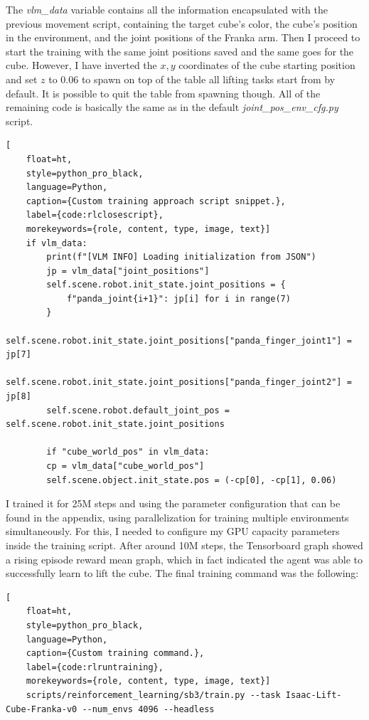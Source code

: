 The \textit{vlm\_data} variable contains all the information encapsulated with the previous movement script, containing the target cube's color, the cube's position in the environment, and the joint positions of the Franka arm. Then I proceed to start the training with the same joint positions saved and the same goes for the cube. However, I have inverted the $x, y$ coordinates of the cube starting position and set $z$ to 0.06 to spawn on top of the table all lifting tasks start from by default. It is possible to quit the table from spawning though. All of the remaining code is basically the same as in the default \textit{joint\_pos\_env\_cfg.py} script.

\begin{lstlisting}[
	float=ht,
	style=python_pro_black,
	language=Python, 
	caption={Custom training approach script snippet.},
	label={code:rlclosescript},
	morekeywords={role, content, type, image, text}]
	if vlm_data:
		print(f"[VLM INFO] Loading initialization from JSON")
		jp = vlm_data["joint_positions"]
		self.scene.robot.init_state.joint_positions = {
			f"panda_joint{i+1}": jp[i] for i in range(7)
		}
		self.scene.robot.init_state.joint_positions["panda_finger_joint1"] = jp[7]
		self.scene.robot.init_state.joint_positions["panda_finger_joint2"] = jp[8]
		self.scene.robot.default_joint_pos = self.scene.robot.init_state.joint_positions
	
		if "cube_world_pos" in vlm_data:
		cp = vlm_data["cube_world_pos"]
		self.scene.object.init_state.pos = (-cp[0], -cp[1], 0.06)
\end{lstlisting}

I trained it for 25M steps and using the parameter configuration that can be found in the appendix, using parallelization for training multiple environments simultaneously. For this, I needed to configure my GPU capacity parameters inside the training script. After around 10M steps, the Tensorboard graph showed a rising episode reward mean graph, which in fact indicated the agent was able to successfully learn to lift the cube. The final training command was the following:

\begin{lstlisting}[
	float=ht, 
	style=python_pro_black,
	language=Python, 
	caption={Custom training command.},
	label={code:rlruntraining},
	morekeywords={role, content, type, image, text}]
	scripts/reinforcement_learning/sb3/train.py --task Isaac-Lift-Cube-Franka-v0 --num_envs 4096 --headless
\end{lstlisting}

